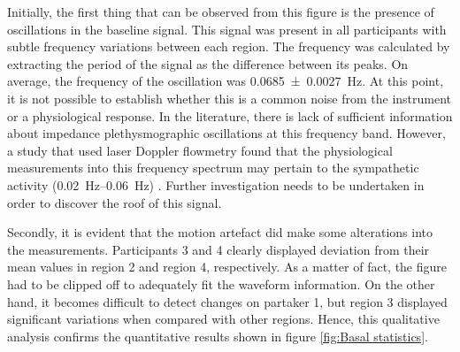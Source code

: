 Initially, the first thing that can be observed from this figure is the presence of oscillations in the baseline signal. This signal was present in all participants with subtle frequency variations between each region. The frequency was calculated by extracting the period of the signal as the difference between its peaks. On average, the frequency of the oscillation was \SI{0.0685(00027)}{\hertz}. At this point, it is not possible to establish whether this is a common noise from the instrument or a physiological response. In the literature, there is lack of sufficient information about impedance plethysmographic oscillations at this frequency band.  However, a study that used laser Doppler flowmetry found that the physiological measurements into this frequency spectrum may pertain to the sympathetic activity (\SIrange{0.02}{0.06}{\hertz}) \cite{kvandal2006low}. Further investigation needs to be undertaken in order to discover the roof of this signal. 

Secondly, it is evident that the motion artefact did make some alterations into the measurements. Participants 3 and 4 clearly displayed deviation from their mean values in region 2 and region 4, respectively. As a matter of fact, the figure had to be clipped off to adequately fit the waveform information. On the other hand, it becomes difficult to detect changes on partaker 1, but region 3 displayed significant variations when compared with other regions. Hence, this qualitative analysis confirms the quantitative results shown in figure \ref{fig:Basal statistics}.  


